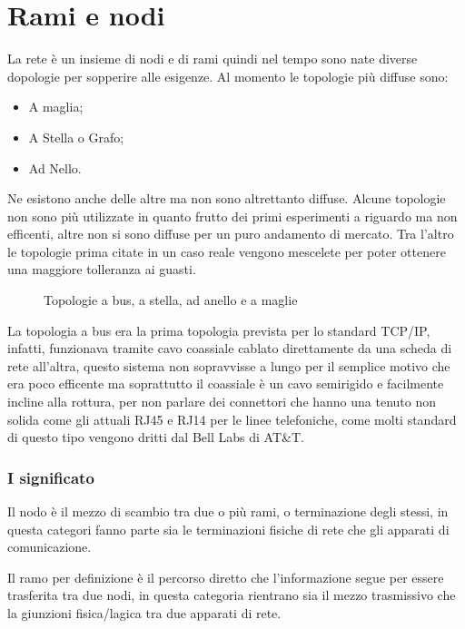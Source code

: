 \section{Rami e nodi}
\label{sec:ramienodi}
\begin{defi}
  La rete è un insieme di nodi e di rami quindi nel tempo
  sono nate diverse dopologie per sopperire alle esigenze. Al momento le topologie più
  diffuse sono:
  \begin{itemize}
  \item A maglia;
  \item A Stella o Grafo;
  \item Ad Nello.
  \end{itemize}
  Ne esistono anche delle altre ma non sono altrettanto diffuse. Alcune topologie
  non sono più utilizzate in quanto frutto dei primi esperimenti a riguardo ma non
  efficenti, altre non si sono diffuse per un puro andamento di mercato.
  Tra l'altro le topologie prima citate in un caso reale vengono mescelete per poter
  ottenere una maggiore tolleranza ai guasti. 
\end{defi}
\begin{figure}[ht]
  \centering
  \resizebox{10cm}{!}{}
  \caption{Topologie a bus, a stella, ad anello e a maglie}
  \label{fig:topologiepiùutilizzate}
\end{figure}
\begin{oss}
  La topologia a bus era la prima topologia prevista per lo standard TCP/IP,
  infatti, funzionava tramite cavo coassiale cablato direttamente da una scheda
  di rete all'altra, questo sistema non sopravvisse a lungo per il semplice
  motivo che era poco efficente ma soprattutto il coassiale è un cavo semirigido
  e facilmente incline alla rottura, per non parlare dei connettori che hanno
  una tenuto non solida come gli attuali RJ45 e RJ14 per le linee telefoniche,
  come molti standard di questo tipo vengono dritti dal Bell Labs di AT\&T.
\end{oss}

\subsubsection{I significato}
\label{sec:significato}
\begin{defi}
  Il nodo è il mezzo di scambio tra due o più rami, o terminazione degli stessi,
  in questa categori fanno parte sia le terminazioni fisiche di rete che
  gli apparati di comunicazione.
\end{defi}
\begin{defi}
  Il ramo per definizione è il percorso diretto che l'informazione segue per essere
  trasferita tra due nodi, in questa categoria rientrano sia il mezzo trasmissivo che
  la giunzioni fisica/lagica tra due apparati di rete. 
\end{defi}

